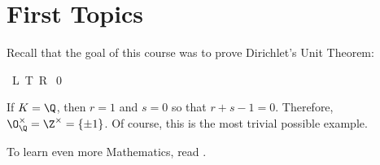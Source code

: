 \newpage
\section{First Topics}

Recall that the goal of this course was to prove Dirichlet's Unit Theorem:

\unit	%

\pf L.T.R. \qed


\begin{ex}
If $K=\Q$, then $r=1$ and $s=0$ so that $r+s-1=0$. Therefore, $\O_\Q^\times=\Z^\times=\{\pm1\}$. Of course, this is the most trivial possible example. \xqed
\end{ex}


To learn even more Mathematics, read \cite{neu}.